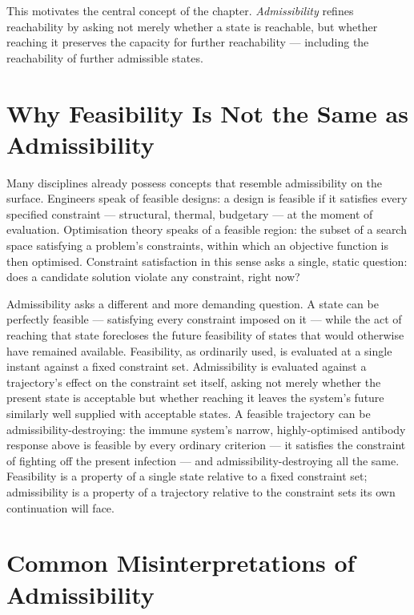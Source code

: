 \documentclass[12pt,twoside,openright]{book}
\begin{document}
This motivates the central concept of the chapter.
\emph{Admissibility} refines reachability by asking not
merely whether a state is reachable, but whether reaching
it preserves the capacity for further reachability ---
including the reachability of further admissible states.

\section{Why Feasibility Is Not the Same as Admissibility}
\label{sec:ch14-why-feasibility}

Many disciplines already possess concepts that resemble
admissibility on the surface. Engineers speak of feasible
designs: a design is feasible if it satisfies every specified
constraint --- structural, thermal, budgetary --- at the
moment of evaluation. Optimisation theory speaks of a
feasible region: the subset of a search space satisfying a
problem's constraints, within which an objective function is
then optimised. Constraint satisfaction in this sense asks a
single, static question: does a candidate solution violate
any constraint, right now?

Admissibility asks a different and more demanding question. A
state can be perfectly feasible --- satisfying every
constraint imposed on it --- while the act of reaching that
state forecloses the future feasibility of states that would
otherwise have remained available. Feasibility, as ordinarily
used, is evaluated at a single instant against a fixed
constraint set. Admissibility is evaluated against a
trajectory's effect on the constraint set itself, asking not
merely whether the present state is acceptable but whether
reaching it leaves the system's future similarly well
supplied with acceptable states. A feasible trajectory can be
admissibility-destroying: the immune system's narrow,
highly-optimised antibody response above is feasible by every
ordinary criterion --- it satisfies the constraint of fighting
off the present infection --- and admissibility-destroying
all the same. Feasibility is a property of a single state
relative to a fixed constraint set; admissibility is a
property of a trajectory relative to the constraint sets its
own continuation will face.

\section{Common Misinterpretations of Admissibility}
\label{sec:ch14-misinterpretations}
\end{document}
